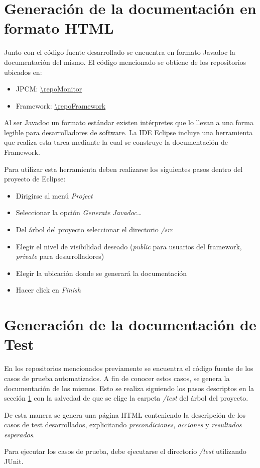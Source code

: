 \section{Generación de la documentación en formato HTML}
\label{genJavadoc}
Junto con el código fuente desarrollado se encuentra en formato Javadoc la
documentación del mismo. El código mencionado se obtiene de los repositorios
ubicados en:
\begin{itemize}
  \item JPCM: \url{\repoMonitor}
  \item \nombreFramework Framework: \url{\repoFramework}
\end{itemize}

 Al ser Javadoc un formato estándar existen intérpretes
que lo llevan a una forma legible para desarrolladores de software.
La IDE Eclipse incluye una herramienta que realiza esta tarea mediante la cual
se construye la documentación de \nombreFramework Framework.

Para utilizar esta herramienta deben realizarse los siguientes pasos dentro del
proyecto de Eclipse:
\begin{itemize}
  \item Dirigirse al menú \textit{Project}
  \item Seleccionar la opción \textit{Generate Javadoc\ldots}
  \item Del árbol del proyecto seleccionar el directorio \textit{/src}
  \item Elegir el nivel de visibilidad deseado (\textit{public} para usuarios
  del framework, \textit{private} para desarrolladores)
  \item Elegir la ubicación donde se generará la documentación
  \item Hacer click en \textit{Finish}
\end{itemize}

\section{Generación de la documentación de Test}
En los repositorios mencionados previamente se encuentra el código fuente de los
casos de prueba automatizados. A fin de conocer estos casos, se genera la
documentación de los mismos.
Esto se realiza siguiendo los pasos descriptos en la sección \ref{genJavadoc}
con la salvedad de que se elige la carpeta \textit{/test} del árbol del proyecto.

De esta manera se genera una página HTML conteniendo la descripción de los casos
de test desarrollados, explicitando \textit{precondiciones}, \textit{acciones} y
\textit{resultados esperados}.

Para ejecutar los casos de prueba, debe ejecutarse el directorio \textit{/test}
utilizando JUnit.

